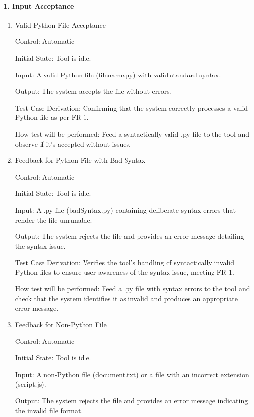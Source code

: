 \documentclass[12pt, titlepage]{article}
\begin{document}
\paragraph{1. Input Acceptance}
\begin{enumerate}
\item{Valid Python File Acceptance\\}

Control: Automatic
					
Initial State: Tool is idle.
					
Input: A valid Python file (filename.py) with valid standard syntax.
					
Output: The system accepts the file without errors.

Test Case Derivation: Confirming that the system correctly processes a valid Python file as per FR 1.
					
How test will be performed: Feed a syntactically valid .py file to the tool and observe if it’s accepted without issues.
					
\item{Feedback for Python File with Bad Syntax\\}

Control: Automatic
					
Initial State: Tool is idle.
					
Input: A .py file (badSyntax.py) containing deliberate syntax errors that render the file unrunable.
					
Output: The system rejects the file and provides an error message detailing the syntax issue.

Test Case Derivation: Verifies the tool’s handling of syntactically invalid Python files to ensure user awareness of the syntax issue, meeting FR 1.

How test will be performed: Feed a .py file with syntax errors to the tool and check that the system identifies it as invalid and produces an appropriate error message.

\item{Feedback for Non-Python File\\}

Control: Automatic
					
Initial State: Tool is idle.
					
Input: A non-Python file (document.txt) or a file with an incorrect extension (script.js).
					
Output: The system rejects the file and provides an error message indicating the invalid file format.


\end{enumerate}
\end{document}
